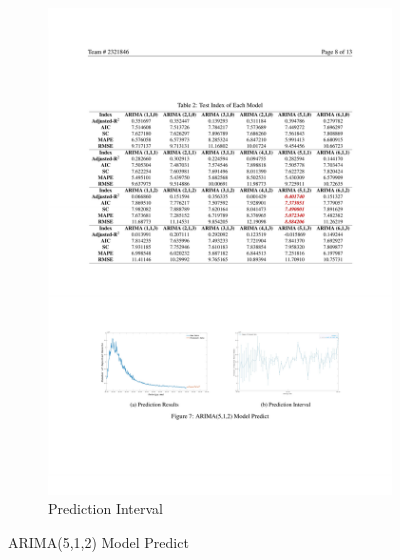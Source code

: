 \documentclass[12pt]{article}  %
\begin{document}
\begin{figure}[htbp]
\begin{subfigure}[b]{.49\textwidth}
\includegraphics[width=\textwidth]{img/wucha.pdf}\caption{Prediction Interval}
\end{subfigure}
\caption{ARIMA(5,1,2) Model Predict}
\end{figure}
\end{document}
